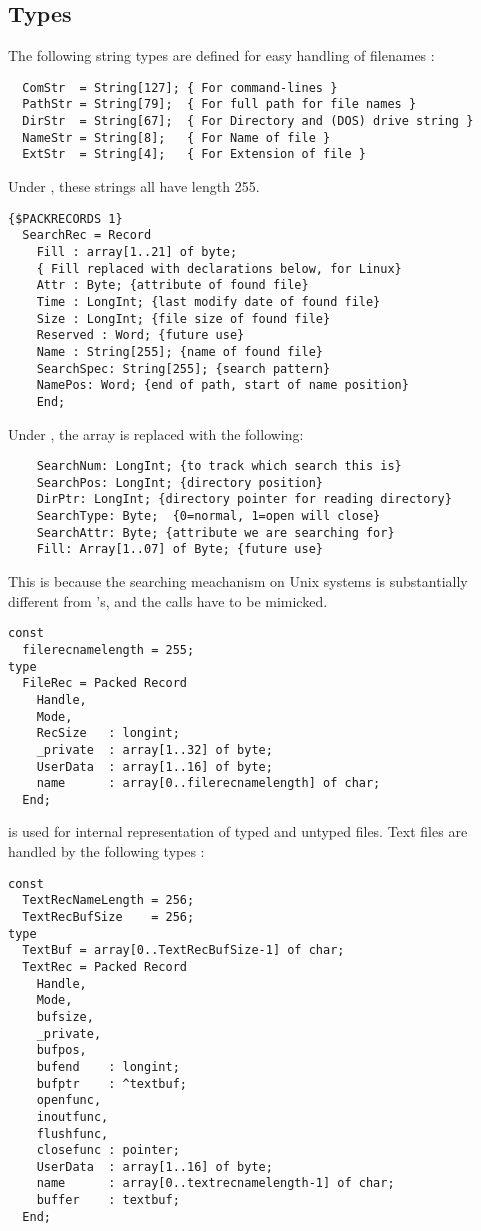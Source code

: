 \subsection{Types}
The following string types are defined for easy handling of
filenames :
\begin{verbatim}
  ComStr  = String[127]; { For command-lines } 
  PathStr = String[79];  { For full path for file names }
  DirStr  = String[67];  { For Directory and (DOS) drive string }
  NameStr = String[8];   { For Name of file }
  ExtStr  = String[4];   { For Extension of file }
\end{verbatim}
Under \linux, these strings all have length 255.
\begin{verbatim}
{$PACKRECORDS 1}
  SearchRec = Record
    Fill : array[1..21] of byte;  
    { Fill replaced with declarations below, for Linux}
    Attr : Byte; {attribute of found file}
    Time : LongInt; {last modify date of found file}
    Size : LongInt; {file size of found file}
    Reserved : Word; {future use}
    Name : String[255]; {name of found file}
    SearchSpec: String[255]; {search pattern}
    NamePos: Word; {end of path, start of name position}
    End;
\end{verbatim}
Under \linux, the  array is replaced with the following:
\begin{verbatim}
    SearchNum: LongInt; {to track which search this is}
    SearchPos: LongInt; {directory position}
    DirPtr: LongInt; {directory pointer for reading directory}
    SearchType: Byte;  {0=normal, 1=open will close}
    SearchAttr: Byte; {attribute we are searching for}
    Fill: Array[1..07] of Byte; {future use}
\end{verbatim}
This is because the searching meachanism on Unix systems is substantially
different from \dos's, and the calls have to be mimicked.
\begin{verbatim}
const
  filerecnamelength = 255;
type
  FileRec = Packed Record
    Handle,
    Mode,  
    RecSize   : longint;
    _private  : array[1..32] of byte;
    UserData  : array[1..16] of byte;
    name      : array[0..filerecnamelength] of char;
  End;
\end{verbatim}
 is used for internal representation of typed and untyped files.
Text files are handled by the following types :
\begin{verbatim}
const
  TextRecNameLength = 256;
  TextRecBufSize    = 256;
type
  TextBuf = array[0..TextRecBufSize-1] of char;
  TextRec = Packed Record
    Handle,
    Mode,  
    bufsize,
    _private,
    bufpos,  
    bufend    : longint;
    bufptr    : ^textbuf;
    openfunc,
    inoutfunc,
    flushfunc,
    closefunc : pointer;
    UserData  : array[1..16] of byte;
    name      : array[0..textrecnamelength-1] of char;
    buffer    : textbuf;
  End;
\end{verbatim}
